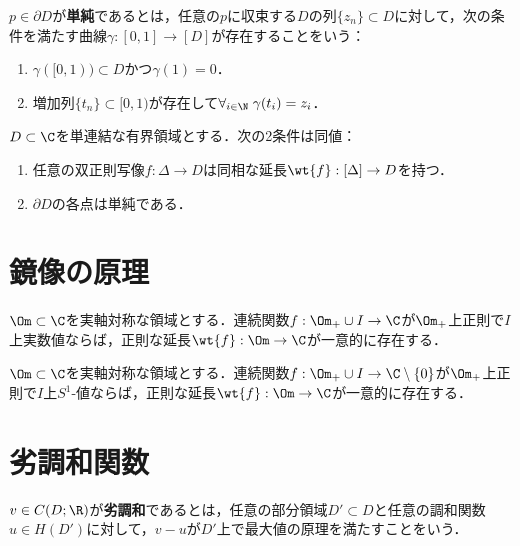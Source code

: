 \documentclass[uplatex, dvipdfmx]{jsreport}
\begin{document}
\begin{definition}
    $p\in\partial D$が\textbf{単純}であるとは，任意の$p$に収束する$D$の列$\{z_n\}\subset D$に対して，次の条件を満たす曲線$\gamma:[0,1]\to[D]$が存在することをいう：
    \begin{enumerate}
        \item $\gamma([0,1))\subset D$かつ$\gamma(1)=0$．
        \item 増加列$\{t_n\}\subset[0,1)$が存在して$\forall_{i\in\N}\;\gamma(t_i)=z_i$．
    \end{enumerate}
\end{definition}

\begin{theorem}
    $D\subset\C$を単連結な有界領域とする．次の2条件は同値：
    \begin{enumerate}
        \item 任意の双正則写像$f:\Delta\to D$は同相な延長$\wt{f}:[\Delta]\to D$を持つ．
        \item $\partial D$の各点は単純である．
    \end{enumerate}
\end{theorem}

\section{鏡像の原理}

\begin{theorem}
    $\Om\subset\C$を実軸対称な領域とする．連続関数$f:\Om_+\cup I\to\C$が$\Om_+$上正則で$I$上実数値ならば，正則な延長$\wt{f}:\Om\to\C$が一意的に存在する．
\end{theorem}

\begin{corollary}
    $\Om\subset\C$を実軸対称な領域とする．連続関数$f:\Om_+\cup I\to\C\setminus\{0\}$が$\Om_+$上正則で$I$上$S^1$-値ならば，正則な延長$\wt{f}:\Om\to\C$が一意的に存在する．
\end{corollary}

\section{劣調和関数}

\begin{definition}
    $v\in C(D;\R)$が\textbf{劣調和}であるとは，任意の部分領域$D'\subset D$と任意の調和関数$u\in H(D')$に対して，$v-u$が$D'$上で最大値の原理を満たすことをいう．
\end{definition}
\end{document}
